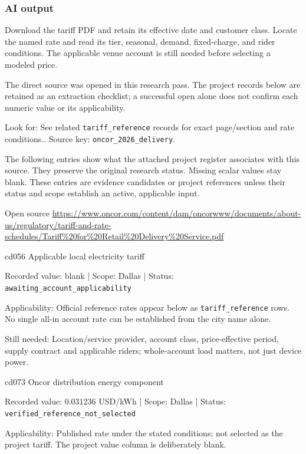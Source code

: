 \subsubsection*{AI output}
Download the tariff PDF and retain its effective date and customer class. Locate the named rate and read its tier, seasonal, demand, fixed-charge, and rider conditions. The applicable venue account is still needed before selecting a modeled price.

The direct source was opened in this research pass. The project records below are retained as an extraction checklist; a successful open alone does not confirm each numeric value or its applicability.

Look for: See related \nolinkurl{tariff_reference} records for exact page/section and rate conditions.. Source key: \nolinkurl{oncor_2026_delivery}.

The following entries show what the attached project register associates with this source. They preserve the original research status. Missing scalar values stay blank. These entries are evidence candidates or project references unless their status and scope establish an active, applicable input.

Open source  \url{https://www.oncor.com/content/dam/oncorwww/documents/about-us/regulatory/tariff-and-rate-schedules/Tariff%20for%20Retail%20Delivery%20Service.pdf}

cd056  Applicable local electricity tariff

Recorded value: blank | Scope: Dallas | Status: \nolinkurl{awaiting_account_applicability}

Applicability: Official reference rates appear below as \nolinkurl{tariff_reference} rows. No single all-in account rate can be established from the city name alone.

Still needed: Location/service provider, account class, price-effective period, supply contract and applicable riders; whole-account load matters, not just device power.

cd073  Oncor distribution energy component

Recorded value: 0.031236 USD/kWh | Scope: Dallas | Status: \nolinkurl{verified_reference_not_selected}

Applicability: Published rate under the stated conditions; not selected as the project tariff. The project value column is deliberately blank.


